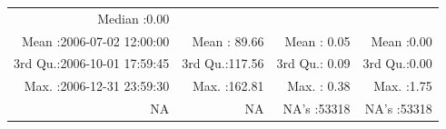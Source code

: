 \documentclass[
  10pt,
  a4paper,oneside]{article}
\begin{document}
\begin{longtable}[]{@{}rrrr@{}}
\begin{minipage}[t]{0.18\columnwidth}
Median :0.00\strut
\end{minipage}\tabularnewline
\begin{minipage}[t]{0.34\columnwidth}\raggedleft
Mean :2006-07-02 12:00:00\strut
\end{minipage} & \begin{minipage}[t]{0.19\columnwidth}\raggedleft
Mean : 89.66\strut
\end{minipage} & \begin{minipage}[t]{0.18\columnwidth}\raggedleft
Mean : 0.05\strut
\end{minipage} & \begin{minipage}[t]{0.18\columnwidth}\raggedleft
Mean :0.00\strut
\end{minipage}\tabularnewline
\begin{minipage}[t]{0.34\columnwidth}\raggedleft
3rd Qu.:2006-10-01 17:59:45\strut
\end{minipage} & \begin{minipage}[t]{0.19\columnwidth}\raggedleft
3rd Qu.:117.56\strut
\end{minipage} & \begin{minipage}[t]{0.18\columnwidth}\raggedleft
3rd Qu.: 0.09\strut
\end{minipage} & \begin{minipage}[t]{0.18\columnwidth}\raggedleft
3rd Qu.:0.00\strut
\end{minipage}\tabularnewline
\begin{minipage}[t]{0.34\columnwidth}\raggedleft
Max. :2006-12-31 23:59:30\strut
\end{minipage} & \begin{minipage}[t]{0.19\columnwidth}\raggedleft
Max. :162.81\strut
\end{minipage} & \begin{minipage}[t]{0.18\columnwidth}\raggedleft
Max. : 0.38\strut
\end{minipage} & \begin{minipage}[t]{0.18\columnwidth}\raggedleft
Max. :1.75\strut
\end{minipage}\tabularnewline
\begin{minipage}[t]{0.34\columnwidth}\raggedleft
NA\strut
\end{minipage} & \begin{minipage}[t]{0.19\columnwidth}\raggedleft
NA\strut
\end{minipage} & \begin{minipage}[t]{0.18\columnwidth}\raggedleft
NA's :53318\strut
\end{minipage} & \begin{minipage}[t]{0.18\columnwidth}\raggedleft
NA's :53318\strut
\end{minipage}\tabularnewline
\bottomrule
\end{longtable}
\end{document}
